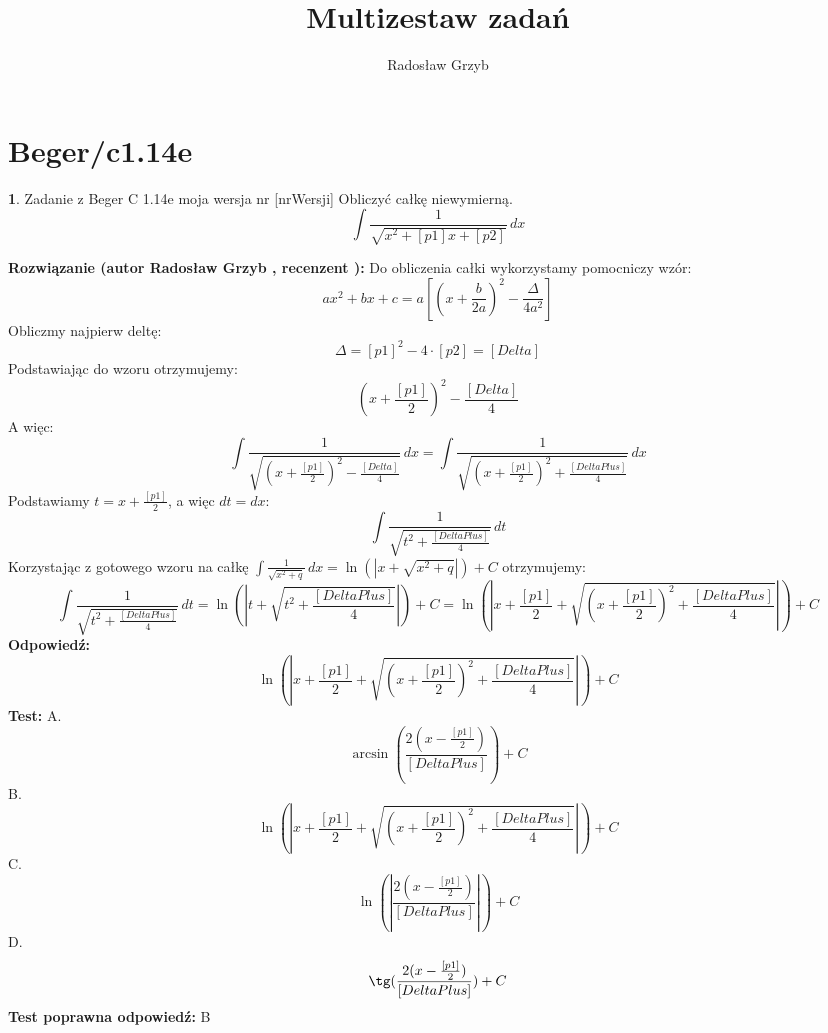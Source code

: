 \documentclass[12pt, a4paper]{article}
\title{Multizestaw zadań}
\author{Radosław Grzyb}
\date{}
\theoremstyle{definition} %
\newtheorem{zad}{}
\newcommand{\kategoria}[1]{\section{#1}} %
\newcommand{\zadStart}[1]{\begin{zad}#1\newline} %
\newcommand{\zadStop}{\end{zad}}   %
\newcommand{\rozwStart}[2]{\noindent \textbf{Rozwiązanie (autor #1 , recenzent #2): }\newline} %
\newcommand{\rozwStop}{\newline}                                            %
\newcommand{\odpStart}{\noindent \textbf{Odpowiedź:}\newline}    %
\newcommand{\odpStop}{\newline}                                             %
\newcommand{\testStart}{\noindent \textbf{Test:}\newline} %
\newcommand{\testStop}{\newline} %
\newcommand{\kluczStart}{\noindent \textbf{Test poprawna odpowiedź:}\newline} %
\newcommand{\kluczStop}{\newline} %
\begin{document}
\maketitle
\kategoria{Beger/c1.14e}
\zadStart{Zadanie z Beger C 1.14e moja wersja nr [nrWersji]}
Obliczyć całkę niewymierną.
$$\int \frac{1}{\sqrt{x^{2}+[p1]x+[p2]}} \,dx$$
\zadStop
\rozwStart{Radosław Grzyb}{}
Do obliczenia całki wykorzystamy pomocniczy wzór:
$$ax^{2}+bx+c = a[(x+\frac{b}{2a})^{2}-\frac{\Delta}{4a^{2}}]$$
Obliczmy najpierw deltę:
$$\Delta=[p1]^2-4\cdot[p2]=[Delta]$$
Podstawiając do wzoru otrzymujemy:
$$(x+\frac{[p1]}{2})^{2}-\frac{[Delta]}{4}$$
A więc:
$$\int \frac{1}{\sqrt{(x+\frac{[p1]}{2})^{2}-\frac{[Delta]}{4}}} \,dx=\int \frac{1}{\sqrt{(x+\frac{[p1]}{2})^{2}+\frac{[DeltaPlus]}{4}}} \,dx$$
Podstawiamy $t=x+\frac{[p1]}{2}$, a więc $dt=dx$:
$$\int\frac{1}{\sqrt{t^{2}+\frac{[DeltaPlus]}{4}}} \,dt$$
Korzystając z gotowego wzoru na całkę  $\int \frac{1}{\sqrt{x^{2}+q}} \,dx = \ln(|x+\sqrt{x^2+q}|)+C$ otrzymujemy:
$$\int\frac{1}{\sqrt{t^{2}+\frac{[DeltaPlus]}{4}}} \,dt=\ln(|t+\sqrt{t^2+\frac{[DeltaPlus]}{4}}|)+C=\ln(|x+\frac{[p1]}{2}+\sqrt{(x+\frac{[p1]}{2})^{2}+\frac{[DeltaPlus]}{4}}|)+C$$
\rozwStop
\odpStart
$$\ln(|x+\frac{[p1]}{2}+\sqrt{(x+\frac{[p1]}{2})^{2}+\frac{[DeltaPlus]}{4}}|)+C$$
\odpStop
\testStart
A.$$\arcsin(\frac{2(x-\frac{[p1]}{2})}{[DeltaPlus]})+C$$
B.$$\ln(|x+\frac{[p1]}{2}+\sqrt{(x+\frac{[p1]}{2})^{2}+\frac{[DeltaPlus]}{4}}|)+C$$
C.$$\ln(|\frac{2(x-\frac{[p1]}{2})}{[DeltaPlus]}|)+C$$
D.$$\tg(\frac{2(x-\frac{[p1]}{2})}{[DeltaPlus]})+C$$
\testStop
\kluczStart
B
\kluczStop
\end{document}
